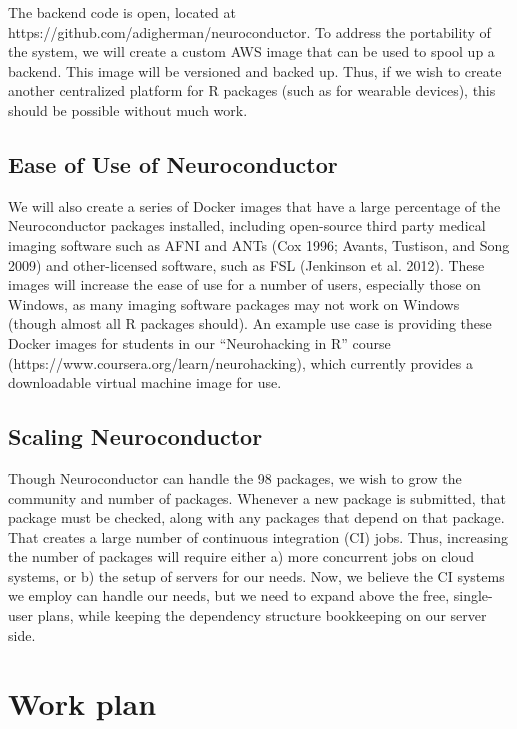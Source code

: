 \documentclass[]{elsarticle} %
\begin{document}
The backend code is open, located at
https://github.com/adigherman/neuroconductor. To address the portability
of the system, we will create a custom AWS image that can be used to
spool up a backend. This image will be versioned and backed up. Thus, if
we wish to create another centralized platform for R packages (such as
for wearable devices), this should be possible without much work.

\subsection{Ease of Use of
Neuroconductor}\label{ease-of-use-of-neuroconductor}

We will also create a series of Docker images that have a large
percentage of the Neuroconductor packages installed, including
open-source third party medical imaging software such as AFNI and ANTs
(Cox 1996; Avants, Tustison, and Song 2009) and other-licensed software,
such as FSL (Jenkinson et al. 2012). These images will increase the ease
of use for a number of users, especially those on Windows, as many
imaging software packages may not work on Windows (though almost all R
packages should). An example use case is providing these Docker images
for students in our ``Neurohacking in R'' course
(https://www.coursera.org/learn/neurohacking), which currently provides
a downloadable virtual machine image for use.

\subsection{Scaling Neuroconductor}\label{scaling-neuroconductor}

Though Neuroconductor can handle the 98 packages, we wish to grow the
community and number of packages. Whenever a new package is submitted,
that package must be checked, along with any packages that depend on
that package. That creates a large number of continuous integration (CI)
jobs. Thus, increasing the number of packages will require either a)
more concurrent jobs on cloud systems, or b) the setup of servers for
our needs. Now, we believe the CI systems we employ can handle our
needs, but we need to expand above the free, single-user plans, while
keeping the dependency structure bookkeeping on our server side.

\section{Work plan}\label{work-plan}
\end{document}
